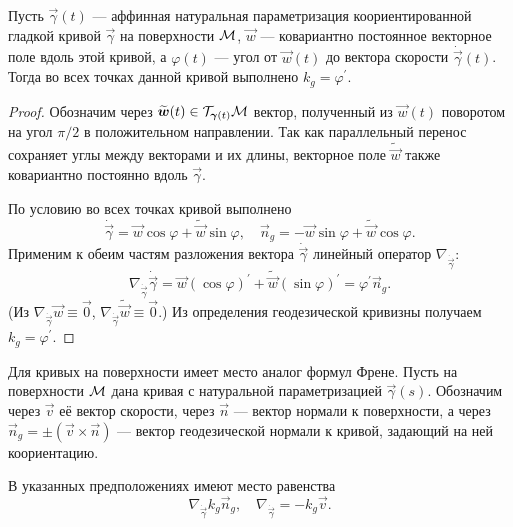 \begin{proposition} \label{proposition:AngleGeodesic}
	Пусть $\vec{\gamma}(t)$ --- аффинная натуральная параметризация коориентированной гладкой кривой $\vec{\gamma}$ на поверхности $\mathcal{M}$, $\vec{w}$ --- ковариантно постоянное векторное поле вдоль этой кривой, а $\varphi(t)$ --- угол от $\vec{w}(t)$ до вектора скорости $\dot{\vec{\gamma}}(t)$. Тогда во всех точках данной кривой выполнено $k_g = \varphi^\prime$.
\end{proposition}

\begin{proof}
	Обозначим через $\widetilde{\boldsymbol{w}}(t) \in \mathcal{T}_{\boldsymbol{\gamma}(t)}\mathcal{M}$ вектор, полученный из $\vec{w}(t)$ поворотом на угол $\pi / 2$ в положительном направлении. Так как параллельный перенос сохраняет углы между векторами и их длины, векторное поле $\widetilde{\vec{w}}$ также ковариантно постоянно вдоль $\vec{\gamma}$.

	По условию во всех точках кривой выполнено
	\[
		\dot{\vec{\gamma}} = \vec{w}\cos\varphi + \widetilde{\vec{w}}\sin\varphi,\quad
		\vec{n}_g = -\vec{w}\sin\varphi + \widetilde{\vec{w}}\cos\varphi.
	\]
	Применим к обеим частям разложения вектора $\dot{\vec{\gamma}}$ линейный оператор $\nabla_{\dot{\vec{\gamma}}}$:
	\[
		\nabla_{\dot{\vec{\gamma}}}\dot{\vec{\gamma}} = \vec{w}(\cos\varphi)^\prime + \widetilde{\vec{w}}(\sin\varphi)^\prime = \varphi^\prime\vec{n}_g.
	\]
	(Из $\nabla_{\dot{\vec{\gamma}}}\vec{w} \equiv \vec{0}$, $\nabla_{\dot{\vec{\gamma}}}\widetilde{\vec{w}} \equiv \vec{0}$.) Из определения геодезической кривизны получаем $k_g = \varphi^\prime$.
\end{proof}

Для кривых на поверхности имеет место аналог формул Френе. Пусть на поверхности $\mathcal{M}$ дана кривая с натуральной параметризацией $\vec{\gamma}(s)$. Обозначим через $\vec{v}$ её вектор скорости, через $\vec{n}$ --- вектор нормали к поверхности, а через $\vec{n}_g = \pm(\vec{v} \times \vec{n})$ --- вектор геодезической нормали к кривой, задающий на ней коориентацию. 

\begin{proposition}
	В указанных предположениях имеют место равенства
	\begin{equation} \label{eq:GeodesicFrenet}
		\nabla_{\dot{\vec{\gamma}}}k_g\vec{n}_g,\quad\nabla_{\dot{\vec{\gamma}}} = -k_g\vec{v}.
	\end{equation}
\end{proposition}


